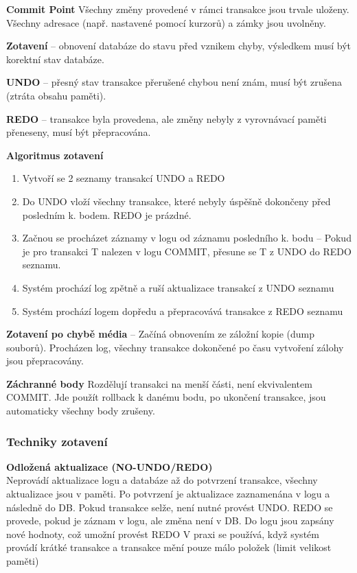 \textbf{Commit Point} Všechny změny provedené v rámci transakce jsou trvale uloženy. Všechny adresace (např. nastavené pomocí kurzorů) a zámky jsou uvolněny.

\textbf{Zotavení} -- obnovení databáze do stavu před vznikem chyby, výsledkem musí být korektní stav databáze.

\textbf{UNDO} -- přesný stav transakce přerušené chybou není znám, musí být zrušena (ztráta obsahu paměti).

\textbf{REDO} -- transakce byla provedena, ale změny nebyly z vyrovnávací paměti přeneseny, musí být přepracována.


\textbf{Algoritmus zotavení}\\
\begin{enumerate}
\item Vytvoří se 2 seznamy transakcí UNDO a REDO
\item Do UNDO vloží všechny transakce, které nebyly úspěšně dokončeny před posledním k. bodem. REDO je prázdné.
\item Začnou se procházet záznamy v logu od záznamu posledního k. bodu -- Pokud je pro transakci T nalezen v logu COMMIT, přesune se T z UNDO do REDO seznamu.
\item Systém prochází log zpětně a ruší aktualizace transakcí z UNDO seznamu
\item Systém prochází logem dopředu a přepracovává transakce z REDO seznamu
\end{enumerate}

\textbf{Zotavení po chybě média} -- Začíná obnovením ze záložní kopie (dump souborů). Procházen log, všechny transakce dokončené po času vytvoření zálohy jsou přepracovány.

\textbf{Záchranné body} Rozdělují transakci na menší části, není ekvivalentem COMMIT. Jde použít rollback k danému bodu, po ukončení transakce, jsou automaticky všechny body zrušeny.

\subsubsection{Techniky zotavení}

\textbf{Odložená aktualizace (NO-UNDO/REDO)}\\
Neprovádí aktualizace logu a databáze až do potvrzení transakce, všechny aktualizace jsou v paměti. Po potvrzení je aktualizace zaznamenána v logu a následně do DB. Pokud transakce selže, není nutné provést UNDO. REDO se provede, pokud je záznam v logu, ale změna není v DB.
Do logu jsou zapsány nové hodnoty, což umožní provést REDO V praxi se používá, když systém provádí krátké transakce a transakce mění pouze málo položek (limit velikost paměti)

